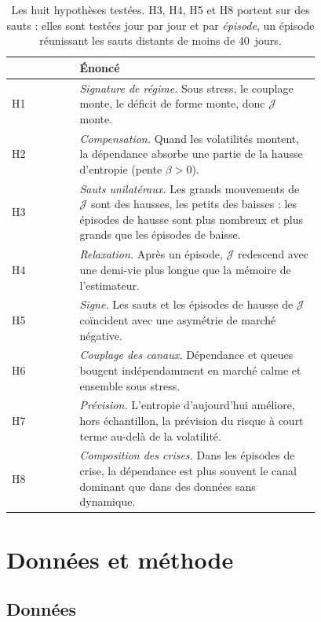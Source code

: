 \documentclass[11pt]{article}
\theoremstyle{definition}
\newcommand{\JJ}{\mathcal{J}}
\begin{document}
\begin{table}[htbp]
\centering
\small
\begin{tabular}{@{}lp{0.78\linewidth}@{}}
\toprule
& Énoncé \\
\midrule
H1 & \emph{Signature de régime.} Sous stress, le couplage monte, le déficit de
forme monte, donc $\JJ$ monte. \\
H2 & \emph{Compensation.} Quand les volatilités montent, la dépendance absorbe
une partie de la hausse d'entropie (pente $\beta>0$). \\
H3 & \emph{Sauts unilatéraux.} Les grands mouvements de $\JJ$ sont des hausses,
les petits des baisses : les épisodes de hausse sont plus nombreux et plus
grands que les épisodes de baisse. \\
H4 & \emph{Relaxation.} Après un épisode, $\JJ$ redescend avec une demi-vie plus
longue que la mémoire de l'estimateur. \\
H5 & \emph{Signe.} Les sauts et les épisodes de hausse de $\JJ$ coïncident avec une asymétrie de marché
négative. \\
H6 & \emph{Couplage des canaux.} Dépendance et queues bougent indépendamment en
marché calme et ensemble sous stress. \\
H7 & \emph{Prévision.} L'entropie d'aujourd'hui améliore, hors échantillon, la
prévision du risque à court terme au-delà de la volatilité. \\
H8 & \emph{Composition des crises.} Dans les épisodes de crise, la dépendance
est plus souvent le canal dominant que dans des données sans dynamique. \\
\bottomrule
\end{tabular}
\caption{Les huit hypothèses testées. H3, H4, H5 et H8 portent sur des
sauts : elles sont testées jour par jour et par \emph{épisode}, un épisode
réunissant les sauts distants de moins de 40~jours.}
\label{tab:hyp}
\end{table}

\section{Données et méthode}
\label{sec:methode}

\subsection{Données}
\end{document}
